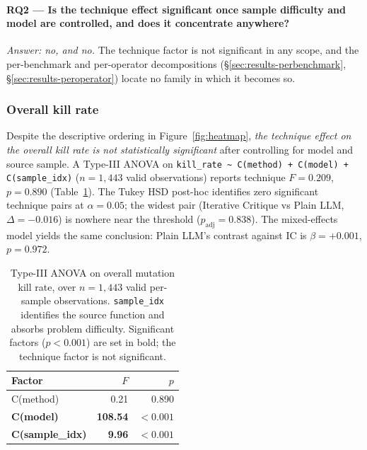 \documentclass[smallextended]{svjour3}
\begin{document}
\paragraph{\textnormal{\textbf{RQ2} --- Is the technique effect significant once sample difficulty and model are controlled, and does it concentrate anywhere?}}
\emph{Answer: no, and no.} The technique factor is not significant in
any scope, and the per-benchmark and per-operator decompositions
(\S\ref{sec:results-perbenchmark}, \S\ref{sec:results-peroperator})
locate no family in which it becomes so.


\subsubsection{Overall kill rate}\label{sec:results-stats-overall}

Despite the descriptive ordering in
Figure~\ref{fig:heatmap}, \emph{the technique effect on the
overall kill rate is not statistically significant} after
controlling for model and source sample. A Type-III ANOVA on
\verb|kill_rate ~ C(method) + C(model) + C(sample_idx)|
($n = 1{,}443$ valid observations) reports technique $F = 0.209$, $p = 0.890$ (Table~\ref{tab:anova-overall}). The Tukey
HSD post-hoc identifies zero significant technique pairs at
$\alpha = 0.05$; the widest pair (Iterative Critique vs Plain LLM, $\Delta = -0.016$) is nowhere near the threshold ($p_{\text{adj}} = 0.838$). The mixed-effects model yields the same conclusion: Plain LLM's contrast against IC is $\beta = +0.001$, $p = 0.972$.

\begin{table}[t]
\centering
\caption{Type-III ANOVA on overall mutation kill rate, over
$n = 1{,}443$ valid per-sample observations.
\texttt{sample\_idx} identifies the source function and absorbs
problem difficulty. Significant factors ($p < 0.001$) are set in
bold; the technique factor is not significant.}\label{tab:anova-overall}
\begin{tabular}{@{}lrr@{}}
\toprule
Factor & $F$ & $p$ \\
\midrule
C(method) & 0.21 & 0.890 \\
\textbf{C(model)} & \textbf{108.54} & $\boldsymbol{<} \boldsymbol{0.001}$ \\
\textbf{C(sample\_idx)} & \textbf{9.96} & $\boldsymbol{<} \boldsymbol{0.001}$ \\
\bottomrule
\end{tabular}
\end{table}
\end{document}
